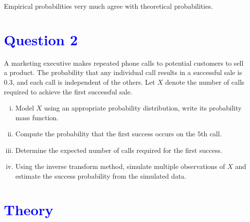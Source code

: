 \documentclass[11pt, a4paper]{article}\usepackage[]{graphicx}\usepackage[]{xcolor}
\begin{document}
\smallpencil \hspace{0.1cm} {\setlength{\spaceskip}{1em plus 0.5em minus 0.5em} \fontsize{17}{20}\myfont Empirical probabilities very much agree with theoretical probabilities. \par}

\newpage

\section*{\faArrowAltCircleRight[regular] \textcolor{blue}{Question 2}}

\hspace{1cm} A marketing executive makes repeated phone calls to potential customers to sell a product. The probability that any individual call results in a successful sale is $0.3$, and each call is independent of the others. Let $X$ denote the number of calls required to achieve the first successful sale.

\begin{enumerate}[(i)]

\item Model $X$ using an appropriate probability distribution, write its probability mass function.

\item Compute the probability that the first success occurs on the $5$th call.

\item Determine the expected number of calls required for the first success. 

\item Using the inverse transform method, simulate multiple observations of $X$ and estimate the success probability from the simulated data.

\end{enumerate}

\section*{\faArrowAltCircleRight[regular] \textcolor{blue}{Theory}}
\end{document}
